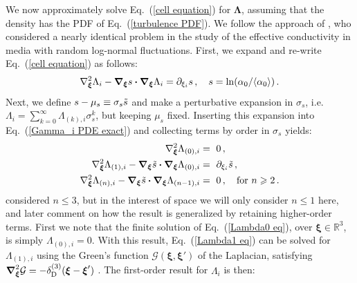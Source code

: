 \documentclass[fleqn,usenatbib]{mnras}
\newcommand\HI{\ion{H}{I}\xspace} %
\begin{document}
We now approximately solve Eq.~(\ref{cell equation}) for $\boldsymbol{\Lambda}$, assuming that the \HI density has the PDF of Eq.~(\ref{turbulence PDF}). We follow the approach of \cite{Dagan1993}, who considered a nearly identical problem in the study of the effective conductivity in media with random log-normal fluctuations. First, we expand and re-write Eq.~(\ref{cell equation}) as follows:
\begin{equation}
    \nabla^2_{\boldsymbol{\xi}} \Lambda_i - \boldsymbol{\nabla}_{\boldsymbol{\xi}} s \boldsymbol{\cdot} \boldsymbol{\nabla}_{\boldsymbol{\xi}} \Lambda_i = \partial_{\xi_i} s \, , \hspace{10 pt} s = \ln(\alpha_0/\langle \alpha_0 \rangle) \,. \label{Gamma_i PDE exact}
\end{equation}
Next, we define $s - \mu_s \equiv \sigma_s \Tilde{s}$ and make a perturbative expansion in $\sigma_s$, i.e. $\Lambda_i = \sum_{k = 0}^\infty \Lambda_{(k), i} \sigma_s^k$, but keeping $\mu_s$ fixed. Inserting this expansion into Eq.~(\ref{Gamma_i PDE exact}) and collecting terms by order in $\sigma_s$ yields: 
\begin{align}
     \nabla^2_{\boldsymbol{\xi}} \Lambda_{(0),i} &=~ 0 \, , \label{Lambda0 eq}\\ \nabla^2_{\boldsymbol{\xi}} \Lambda_{(1),i} - \boldsymbol{\nabla}_{\boldsymbol{\xi}} \Tilde{s} \boldsymbol{\cdot} \boldsymbol{\nabla}_{\boldsymbol{\xi}} \Lambda_{(0),i} &=~ \partial_{\xi_i} \Tilde{s} \, , \label{Lambda1 eq}\\ \nabla^2_{\boldsymbol{\xi}} \Lambda_{(n),i} - \boldsymbol{\nabla}_{\boldsymbol{\xi}} \Tilde{s} \boldsymbol{\cdot} \boldsymbol{\nabla}_{\boldsymbol{\xi}} \Lambda_{(n-1),i} &=~ 0 \, , \hspace{10 pt} \textrm{for } n \geq 2 \, \label{Lambda2 eq}.
\end{align}
\cite{Dagan1993} considered $n \leq 3$, but in the interest of space we will only consider $n \leq 1$ here, and later comment on how the result is generalized by retaining higher-order terms. First we note that the finite solution of Eq.~(\ref{Lambda0 eq}), over $\boldsymbol{\xi} \in \mathbb{R}^3$, is simply $\Lambda_{(0),i} = 0$. With this result, Eq.~(\ref{Lambda1 eq}) can be solved for $\Lambda_{(1),i}$ using the Green's function $\mathcal{G}(\boldsymbol{\xi},\boldsymbol{\xi}')$ of the Laplacian, satisfying $\boldsymbol{\nabla}_{\boldsymbol{\xi}}^2 \mathcal{G} = - \delta_{\rm D}^{(3)}(\boldsymbol{\xi} - \boldsymbol{\xi}')$ \citep[e.g.][]{Arfken2013}. The first-order result for $\Lambda_i$ is then:
\end{document}
